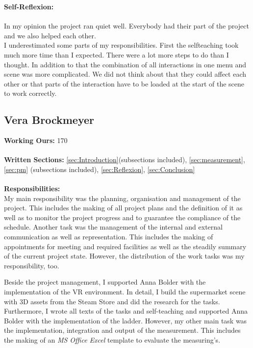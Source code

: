 \textbf{Self-Reflexion:}\\ \\
In my opinion the project ran quiet well. Everybody had their part of the project and we also helped each other.\\
I underestimated some parts of my responsibilities. First the selfteaching took much more time than I expected. There were a lot more steps to do than I thought. In addition to that the combination of all interactions in one menu and scene was more complicated. We did not think about that they could affect each other or that parts of the interaction have to be loaded at the start of the scene to work correctly.\\

\newpage

\newpage
\subsection{Vera Brockmeyer} \label{sec:SAVera}


\textbf{Working Ours:} 170 \\ \\
\textbf{Written Sections: }\ref{sec:Introduction}(subsections included),  \ref{sec:measurement}, \ref{sec:pm} (subsections included), \ref{sec:Reflexion}, \ref{sec:Conclusion} \\ \\
\textbf{Responsibilities:}\\ 
My main responsibility was the planning, organisation and management of the project. This includes the making of all project plans and the definition of it as well as to monitor the project progress and to guarantee the compliance of the schedule. Another task was the management of the internal and external communication as well as representation. This includes the making of appointments for meeting and required facilities as well as the steadily summary of the current project state. However, the distribution of the work tasks was my responsibility, too.

Beside the project management, I supported Anna Bolder with the implementation of the VR environment. In detail, I build the supermarket scene with 3D assets from the Steam Store and did the research for the tasks. Furthermore, I wrote all texts of the tasks and self-teaching and supported Anna Bolder with the implementation of the ladder. However, my other main task was the implementation, integration and output of the measurement. This includes the making of an \textit{MS Office Excel} template to evaluate the measuring's.


